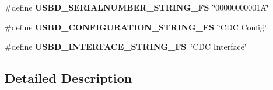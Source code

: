 \begin{DoxyCompactItemize}
\#define {\bfseries U\+S\+B\+D\+\_\+\+S\+E\+R\+I\+A\+L\+N\+U\+M\+B\+E\+R\+\_\+\+S\+T\+R\+I\+N\+G\+\_\+\+FS}~\char`\"{}00000000001\+A\char`\"{}
\item 
\mbox{\label{group___u_s_b_d___d_e_s_c___private___defines_gaca5e66e8b6c89a896f6ad16f9a68128f}} 
\#define {\bfseries U\+S\+B\+D\+\_\+\+C\+O\+N\+F\+I\+G\+U\+R\+A\+T\+I\+O\+N\+\_\+\+S\+T\+R\+I\+N\+G\+\_\+\+FS}~\char`\"{}C\+DC Config\char`\"{}
\item 
\mbox{\label{group___u_s_b_d___d_e_s_c___private___defines_ga2562ccc9162020b79f07d813eba10ddb}} 
\#define {\bfseries U\+S\+B\+D\+\_\+\+I\+N\+T\+E\+R\+F\+A\+C\+E\+\_\+\+S\+T\+R\+I\+N\+G\+\_\+\+FS}~\char`\"{}C\+DC Interface\char`\"{}
\end{DoxyCompactItemize}


\subsection{Detailed Description}
